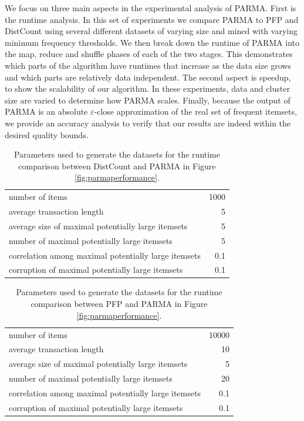 We focus on three main aspects in the experimental analysis of PARMA. First is the runtime
analysis. In this set of experiments we compare PARMA to PFP and DistCount using several
different datasets of varying size and mined with varying minimum frequency thresholds. We
then break down the runtime of PARMA into the map, reduce and shuffle phases of each of
the two stages. This demonstrates which parts of the algorithm have runtimes that increase
as the data size grows and which parts are relatively data independent. The second aspect
is speedup, to show the scalability of our algorithm. In these experiments, data and
cluster size are varied to determine how PARMA scales. Finally, because the output of
PARMA is an absolute $\varepsilon$-close approximation of the real set of frequent itemsets, we provide
an accuracy analysis to verify that our results are indeed within the desired quality
bounds.

\begin{table}[tb] \centering
\begin{tabular}{ l  r } \hline number of items & 1000 \\ 
average transaction length & 5 \\ 
average size of maximal potentially large itemsets & 5 \\ 
number of maximal potentially large itemsets & 5 \\
correlation among maximal potentially large itemsets & 0.1 \\
corruption of maximal potentially large itemsets & 0.1 \\ \hline
\end{tabular}
  \caption{Parameters used to generate the datasets for the runtime comparison between 
  DistCount and PARMA in Figure \ref{fig:parmaperformance}.}
  \label{tab:param1}
\end{table}

\begin{table}[tb] \centering
\begin{tabular}{ l  r } 
\hline 
number of items & 10000 \\ 
average transaction length & 10 \\ 
average size of maximal potentially large itemsets & 5 \\ 
number of maximal potentially large itemsets & 20 \\
correlation among maximal potentially large itemsets & 0.1 \\
corruption of maximal potentially large itemsets & 0.1 \\ 
\hline
\end{tabular}
  \caption{Parameters used to generate the datasets for the runtime comparison
  between PFP and PARMA in Figure \ref{fig:parmaperformance}.}
  \label{tab:param2}
\end{table}


